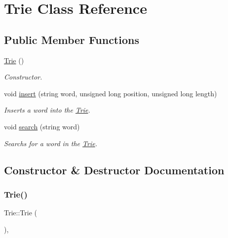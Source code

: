 \hypertarget{class_trie}{}\section{Trie Class Reference}
\label{class_trie}
\subsection*{Public Member Functions}
\begin{DoxyCompactItemize}
\item 
\hyperlink{class_trie_a6af57e9f25d0d0a2d59eea5a4a802908}{Trie} ()
\begin{DoxyCompactList}\small\item\em Constructor. \end{DoxyCompactList}\item 
void \hyperlink{class_trie_ac70c3f72a0a75a765daf8fe979da78bc}{insert} (string word, unsigned long position, unsigned long length)
\begin{DoxyCompactList}\small\item\em Inserts a word into the \hyperlink{class_trie}{Trie}. \end{DoxyCompactList}\item 
void \hyperlink{class_trie_a4a456fa18bd182666a67cc5fee3a07e1}{search} (string word)
\begin{DoxyCompactList}\small\item\em Searchs for a word in the \hyperlink{class_trie}{Trie}. \end{DoxyCompactList}\end{DoxyCompactItemize}


\subsection{Constructor \& Destructor Documentation}
\mbox{\label{class_trie_a6af57e9f25d0d0a2d59eea5a4a802908}} 
\subsubsection{\texorpdfstring{Trie()}{Trie()}}
{\footnotesize\ttfamily Trie\+::\+Trie (\begin{DoxyParamCaption}{ }\end{DoxyParamCaption})\hspace{0.3cm}{\ttfamily [inline]}, {\ttfamily [explicit]}}



